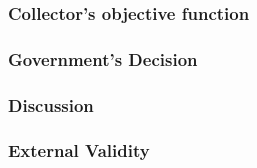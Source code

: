\documentclass[12pt,english]{article}
\begin{document}
\subsubsection{Collector's objective function}

\label{collector_OF}


\subsubsection{Government's Decision}


\label{govt_OF}


\label{govt_constraints} 


\subsubsection{Discussion}


\subsubsection{External Validity}\label{external_validity_model}

\end{document}
